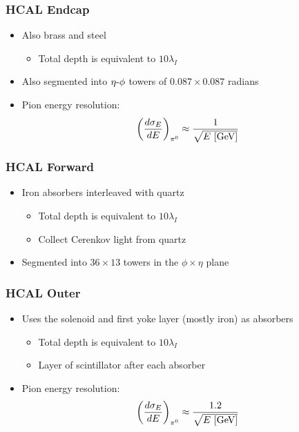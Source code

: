 \subsubsection{HCAL Endcap}
\begin{itemize}
  \item Also brass and steel
  \begin{itemize}
    \item Total depth is equivalent to $10\lambda_I$
  \end{itemize}
  \item Also segmented into $\eta\textto\phi$ towers of $0.087\times0.087$ radians
  \item Pion energy resolution:
  \begin{equation}
    \left(\dfrac{d \sigma_E}{d E}\right)_{\pi^0} \approx \frac{1}{\sqrt{E~[\text{GeV}]}}
  \end{equation}
\end{itemize}


\subsubsection{HCAL Forward}
\begin{itemize}
  \item Iron absorbers interleaved with quartz
  \begin{itemize}
    \item Total depth is equivalent to $10\lambda_I$
    \item Collect Cerenkov light from quartz
  \end{itemize}
  \item Segmented into $36\times13$ towers in the $\phi\times\eta$ plane
\end{itemize}

\subsubsection{HCAL Outer}
\begin{itemize}
  \item Uses the solenoid and first yoke layer (mostly iron) as absorbers 
  \begin{itemize}
    \item Total depth is equivalent to $10\lambda_I$
    \item Layer of scintillator after each absorber
  \end{itemize}
  \item Pion energy resolution:
  \begin{equation}
    \left(\dfrac{d \sigma_E}{d E}\right)_{\pi^0} \approx \frac{1.2}{\sqrt{E~[\text{GeV}]}}
  \end{equation}
\end{itemize}

